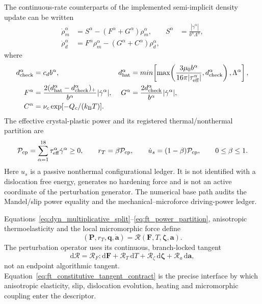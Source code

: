 The continuous-rate counterparts of the implemented semi-implicit density update can be written
\begin{align}
 \dot\rho_m^\alpha&=S^\alpha-(F^\alpha+G^\alpha)\rho_m^\alpha,
 &S^\alpha&=\frac{|\dot\gamma^\alpha|}{b^\alpha\Lambda^\alpha},
 \label{eq:ft_mobile_density}\\
 \dot\rho_d^\alpha&=F^\alpha\rho_m^\alpha-(G^\alpha+C^\alpha)\rho_d^\alpha,
 \label{eq:ft_dipole_density}
\end{align}
where
\begin{align}
 d_{\rm check}^\alpha&=c_d b^\alpha,
 &d_{\rm hat}^\alpha&=min\!\left[
 \max\!\left(\frac{3\mu_0b^\alpha}{16\pi|\tau_{\rm eff}^\alpha|},
 d_{\rm check}^\alpha\right),\Lambda^\alpha\right],\\
 F^\alpha&=\frac{2(d_{\rm hat}^\alpha-d_{\rm check}^\alpha)_+}{b^\alpha}
 |\dot\gamma^\alpha|,
 &G^\alpha&=\frac{2d_{\rm check}^\alpha}{b^\alpha}|\dot\gamma^\alpha|,\\
 C^\alpha&=\nu_c\exp[-Q_c/(k_{\rm B}T)].
 \label{eq:ft_density_rates}
\end{align}
The effective crystal-plastic power and its registered thermal/nonthermal
partition are
\begin{equation}
 \mathcal P_{\rm cp}=\sum_{\alpha=1}^{18}
 \tau_{\rm eff}^\alpha\dot\gamma^\alpha\ge0,
 \qquad r_T=\beta\mathcal P_{\rm cp},
 \qquad \dot u_s=(1-\beta)\mathcal P_{\rm cp},
 \qquad 0\le\beta\le1.
 \label{eq:ft_power_partition}
\end{equation}
Here $u_s$ is a passive nonthermal configurational ledger. It is not identified
with a dislocation free energy, generates no hardening force and is not an
active coordinate of the perturbation generator. The numerical base path
audits the Mandel/slip power equality and the mechanical--microforce
driving-power ledger.

Equations~\eqref{eq:dyn_multiplicative_split}--\eqref{eq:ft_power_partition}, anisotropic thermoelasticity and the local micromorphic force define
\begin{equation}
 (\boldsymbol P,r_T,\boldsymbol q,\dot{\boldsymbol a})
 =\boldsymbol{\mathcal R}(\boldsymbol F,T,\boldsymbol\zeta,\boldsymbol a).
 \label{eq:dyn_constitutive_map}
\end{equation}
The perturbation operator uses its continuous, branch-locked tangent
\begin{equation}
 \mathrm d\boldsymbol{\mathcal R}
 =\boldsymbol{\mathcal R}_{F}:\mathrm d\boldsymbol F
 +\boldsymbol{\mathcal R}_{T}\,\mathrm dT
 +\boldsymbol{\mathcal R}_{\zeta}\,\mathrm d\boldsymbol\zeta
 +\boldsymbol{\mathcal R}_{a}\,\mathrm d\boldsymbol a,
 \label{eq:ft_constitutive_tangent_contract}
\end{equation}
not an endpoint algorithmic tangent. Equation~\eqref{eq:ft_constitutive_tangent_contract} is the precise interface by which anisotropic elasticity, slip, dislocation evolution, heating and micromorphic coupling enter the descriptor.

